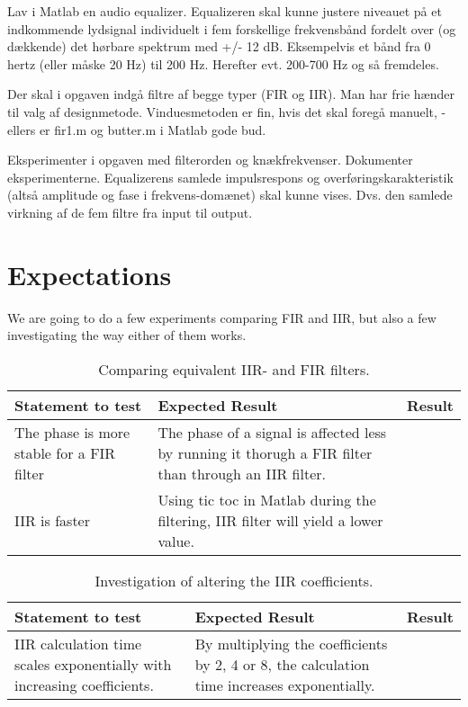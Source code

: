 Lav i Matlab en audio equalizer. Equalizeren skal kunne justere niveauet på et indkommende lydsignal individuelt i fem forskellige frekvensbånd fordelt over (og dækkende) det hørbare spektrum med +/- 12 dB. Eksempelvis et bånd fra 0 hertz (eller måske 20 Hz) til 200 Hz. Herefter evt. 200-700 Hz og så fremdeles.

Der skal i opgaven indgå filtre af begge typer (FIR og IIR). Man har frie hænder til valg af designmetode. Vinduesmetoden er fin, hvis det skal foregå manuelt, - ellers er fir1.m og butter.m i Matlab gode bud.

Eksperimenter i opgaven med filterorden og knækfrekvenser. Dokumenter eksperimenterne. Equalizerens samlede impulsrespons og overføringskarakteristik (altså amplitude og fase i frekvens-domænet) skal kunne vises. Dvs. den samlede virkning af de fem filtre fra input til output.

\section{Expectations}
We are going to do a few experiments comparing FIR and IIR, but also a few investigating the way either of them works.

\begin{table}
	\caption{Comparing equivalent IIR- and FIR filters.}
	\label{tab:IIRvsFIR}
	\begin{tabularx}{\textwidth}{X X X}
		Statement to test	& Expected Result	& Result \\
		\toprule
		The phase is more stable for a FIR filter & The phase of a signal is affected less by running it thorugh a FIR filter than through an IIR filter. & \\
		IIR is faster		& Using tic toc in Matlab during the filtering, IIR filter will yield a lower value. & \\
	\end{tabularx}
\end{table}

\begin{table}
	\caption{Investigation of altering the IIR coefficients.}
	\label{tab:IIRtest}
	\begin{tabularx}{\textwidth}{X X X}
		Statement to test	& Expected Result	& Result \\
		\toprule
		IIR calculation time scales exponentially with increasing coefficients. & By multiplying the coefficients by 2, 4 or 8, the calculation time increases exponentially. & \\
	\end{tabularx}
\end{table}